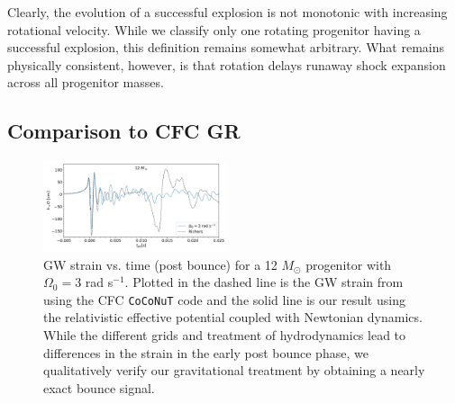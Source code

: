\documentclass[twocolumn,times]{aastex62}  %
\begin{document}
Clearly, the evolution of a successful explosion is not monotonic with increasing rotational velocity.  While we classify only one rotating progenitor having a successful explosion, this definition remains somewhat arbitrary.  What remains physically consistent, however, is that rotation delays runaway shock expansion across all progenitor masses.

\subsection{Comparison to CFC GR}

 \begin{figure}[t]
    \centering
    \includegraphics[width=0.48\textwidth]{figures/bounce_richers.pdf}
    \caption{GW strain vs. time (post bounce) for a 12 \(M_\odot\) progenitor with $\Omega_0 = 3$ rad s$^{-1}$.  Plotted in the dashed line is the GW strain from \citet{richers:2017} using the CFC \texttt{CoCoNuT} code and the solid line is our result using the relativistic effective potential coupled with Newtonian dynamics.  While the different grids and treatment of hydrodynamics lead to differences in the strain in the early post bounce phase, we qualitatively verify our gravitational treatment by obtaining a nearly exact bounce signal. }
    \label{fig:bounce_cfc}
\end{figure}
\end{document}
